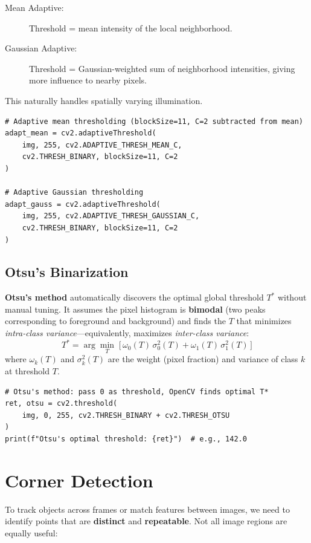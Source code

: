 \begin{description}
    \item[Mean Adaptive:] Threshold = mean intensity of the local neighborhood.
    \item[Gaussian Adaptive:] Threshold = Gaussian-weighted sum of neighborhood intensities, giving more influence to nearby pixels.
\end{description}

This naturally handles spatially varying illumination.

\begin{lstlisting}[style=pythonstyle]
# Adaptive mean thresholding (blockSize=11, C=2 subtracted from mean)
adapt_mean = cv2.adaptiveThreshold(
    img, 255, cv2.ADAPTIVE_THRESH_MEAN_C,
    cv2.THRESH_BINARY, blockSize=11, C=2
)

# Adaptive Gaussian thresholding
adapt_gauss = cv2.adaptiveThreshold(
    img, 255, cv2.ADAPTIVE_THRESH_GAUSSIAN_C,
    cv2.THRESH_BINARY, blockSize=11, C=2
)
\end{lstlisting}

\subsection*{Otsu's Binarization}

\textbf{Otsu's method} automatically discovers the optimal global threshold $T^*$ without manual tuning. It assumes the pixel histogram is \textbf{bimodal} (two peaks corresponding to foreground and background) and finds the $T$ that minimizes \textit{intra-class variance}---equivalently, maximizes \textit{inter-class variance}:
$$
T^* = \arg\min_T \;\bigl[\, \omega_0(T)\,\sigma_0^2(T) + \omega_1(T)\,\sigma_1^2(T) \,\bigr]
$$
where $\omega_k(T)$ and $\sigma_k^2(T)$ are the weight (pixel fraction) and variance of class $k$ at threshold $T$.

\begin{lstlisting}[style=pythonstyle]
# Otsu's method: pass 0 as threshold, OpenCV finds optimal T*
ret, otsu = cv2.threshold(
    img, 0, 255, cv2.THRESH_BINARY + cv2.THRESH_OTSU
)
print(f"Otsu's optimal threshold: {ret}")  # e.g., 142.0
\end{lstlisting}

\section*{Corner Detection}

To track objects across frames or match features between images, we need to identify points that are \textbf{distinct} and \textbf{repeatable}. Not all image regions are equally useful:

